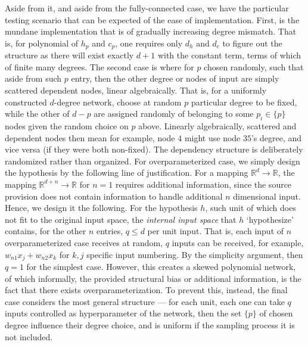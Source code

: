 \documentclass[
  journal=largetwo,
  year=2025,
  volume=37,
]{cup-journal}
\begin{document}
Aside from it, and aside from the fully-connected case, we have the particular testing scenario that can be expected of the ease of implementation. First, is the mundane implementation that is of gradually increasing degree mismatch. That is, for polynomial of $h_{p}$ and $c_{p}$, one requires only $d_{h}$ and $d_{c}$ to figure out the structure as there will exist exactly $d+1$ with the constant term, terms of which of finite many degrees. The second case is where for $p$ chosen randomly, such that aside from such $p$ entry, then the other degree or nodes of input are simply scattered dependent nodes, linear algebraically. That is, for a uniformly constructed $d$-degree network, choose at random $p$ particular degree to be fixed, while the other of $d-p$ are assigned randomly of belonging to some $p_{i}\in \{p\}$ nodes given the random choice on $p$ above. Linearly algebraically, scattered and dependent nodes then mean for example, node $4$ might use node $35$'s degree, and vice versa (if they were both non-fixed). The dependency structure is deliberately randomized rather than organized. For overparameterized case, we simply design the hypothesis by the following line of justification. For a mapping $\mathbb{R}^{d}\to\mathbb{R}$, the mapping $\mathbb{R}^{d+n}\to \mathbb{R}$ for $n= 1$ requires additional information, since the source provision does not contain information to handle additional $n$ dimensional input. Hence, we design it the following. For the hypothesis $h$, such unit of which does not fit to the original input space, the \textit{internal input space} that $h$ `hypothesize' contains, for the other $n$ entries, $q\leq d$ per unit input. That is, each input of $n$ overparameterized case receives at random, $q$ inputs can be received, for example, $w_{n1}x_{j}+w_{n2}x_{k}$ for $k,j$ specific input numbering. By the simplicity argument, then $q=1$ for the simplest case. However, this creates a skewed polynomial network, of which informally, the provided structural bias or additional information, is the fact that there exists overparameterization. To prevent this, instead, the final case considers the most general structure --- for each unit, each one can take $q$ inputs controlled as hyperparameter of the network, then the set $\{p\}$ of chosen degree influence their degree choice, and is uniform if the sampling process it is not included. 


\clearpage

\end{document}
